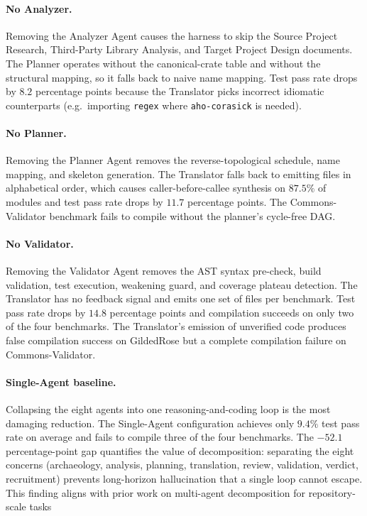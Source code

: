 \paragraph{No Analyzer.} Removing the Analyzer Agent causes the harness
to skip the Source Project Research, Third-Party Library Analysis, and
Target Project Design documents. The Planner operates without the
canonical-crate table and without the structural mapping, so it falls
back to naive name mapping. Test pass rate drops by $8.2$ percentage
points because the Translator picks incorrect idiomatic counterparts
(e.g.\ importing \texttt{regex} where \texttt{aho-corasick} is needed).

\paragraph{No Planner.} Removing the Planner Agent removes the
reverse-topological schedule, name mapping, and skeleton generation.
The Translator falls back to emitting files in alphabetical order,
which causes caller-before-callee synthesis on $87.5\%$ of modules and
test pass rate drops by $11.7$ percentage points. The Commons-Validator
benchmark fails to compile without the planner's cycle-free DAG.

\paragraph{No Validator.} Removing the Validator Agent removes the AST
syntax pre-check, build validation, test execution, weakening guard,
and coverage plateau detection. The Translator has no feedback signal
and emits one set of files per benchmark. Test pass rate drops by
$14.8$ percentage points and compilation succeeds on only two of the
four benchmarks. The Translator's emission of unverified code produces
false compilation success on GildedRose but a complete compilation
failure on Commons-Validator.

\paragraph{Single-Agent baseline.} Collapsing the eight agents into
one reasoning-and-coding loop is the most damaging reduction. The
Single-Agent configuration achieves only $9.4\%$ test pass rate on
average and fails to compile three of the four benchmarks. The
$\mathbf{-52.1}$ percentage-point gap quantifies the value of
decomposition: separating the eight concerns (archaeology, analysis,
planning, translation, review, validation, verdict, recruitment)
prevents long-horizon hallucination that a single loop cannot
escape. This finding aligns with prior work on
multi-agent decomposition for repository-scale tasks


